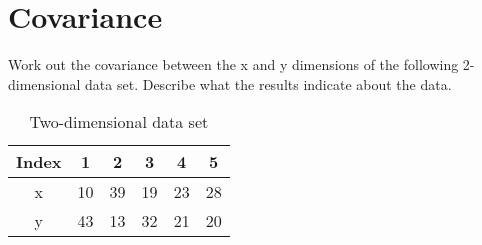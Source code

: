 \section{Covariance}
Work out the covariance between the x and y dimensions of the following 2-dimensional data set.
Describe what the results indicate about the data.

\begin{table}[H]
\centering
  \begin{tabular}{c|c|c|c|c|c}
    Index &  1 &  2 &  3 &  4 &  5 \\ \hline
    x     & 10 & 39 & 19 & 23 & 28 \\
    y     & 43 & 13 & 32 & 21 & 20 \\ \hline
  \end{tabular}
  \caption{Two-dimensional data set}
  \label{tab:cov}
\end{table}



